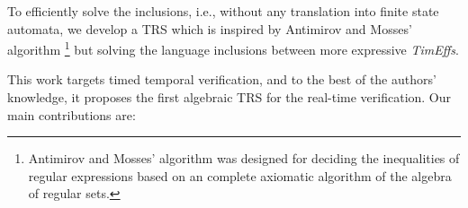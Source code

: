 \documentclass[acmsmall,10pt,review]{acmart}
\newcommand{\timedEffects}{\emph{TimEffs}}
\begin{document}
To efficiently solve the inclusions, i.e., without any translation into
finite state automata, we develop a TRS
which  is inspired by Antimirov and Mosses’ algorithm 
\cite{antimirov1995rewriting}\footnote{Antimirov and Mosses' 
algorithm was designed for deciding the inequalities of regular 
expressions based on an 
complete 
axiomatic algorithm of the algebra of regular sets.} but solving the 
language inclusions between more expressive \timedEffects.  

This work targets timed temporal verification, and to the best of 
the authors' knowledge, it proposes the first algebraic TRS 
 for the real-time verification. 
  Our main contributions are:%
\end{document}
